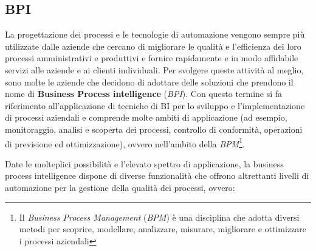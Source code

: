 \subsection{BPI}

La progettazione dei processi e le tecnologie di automazione vengono sempre più utilizzate dalle aziende che cercano di migliorare le qualità e l'efficienza dei loro processi amministrativi e produttivi e fornire rapidamente e in modo affidabile servizi alle aziende e ai clienti individuali. Per svolgere queste attività al meglio, sono molte le aziende che decidono di adottare delle soluzioni che prendono il nome di \textbf{Business Process intelligence} (\textit{BPI}). Con questo termine si fa riferimento all'applicazione di tecniche di BI per lo sviluppo e l'implementazione di processi aziendali e comprende molte ambiti di applicazione (ad esempio, monitoraggio, analisi e scoperta dei processi, controllo di conformità, operazioni di previsione ed ottimizzazione), ovvero nell'ambito della \textit{BPM}\footnote{Il \textit{Business Process Management} (\textit{BPM}) è una disciplina che adotta diversi metodi per scoprire, modellare, analizzare, misurare, migliorare e ottimizzare i processi aziendali\cite{gartner_bpm}}.\cite{academiaedu_bpi_definition}

Date le molteplici possibilità e l'elevato spettro di applicazione, la business process intelligence dispone di diverse funzionalità che offrono altrettanti livelli di automazione per la gestione della qualità dei processi, ovvero:\cite{academiaedu_bpi_feautures}

